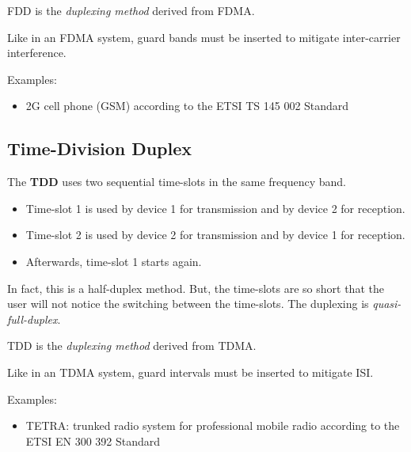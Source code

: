 \begin{refsection}
\ac{FDD} is the \emph{duplexing method} derived from \ac{FDMA}.

\begin{remark}
	Like in an \ac{FDMA} system, guard bands must be inserted to mitigate inter-carrier interference.
\end{remark}

Examples:
\begin{itemize}
	\item 2G cell phone (\acs{GSM}) according to the \acs{ETSI} TS 145 002 Standard \cite{etsits145002}
\end{itemize}

\subsection{Time-Division Duplex}

The  \textbf{\acf{TDD}} uses two sequential time-slots in the same frequency band.
\begin{itemize}
	\item Time-slot 1 is used by device 1 for transmission and by device 2 for reception.
	\item Time-slot 2 is used by device 2 for transmission and by device 1 for reception.
	\item Afterwards, time-slot 1 starts again.
\end{itemize}
In fact, this is a half-duplex method. But, the time-slots are so short that the user will not notice the switching between the time-slots. The duplexing is \emph{quasi-full-duplex}.

\ac{TDD} is the \emph{duplexing method} derived from \ac{TDMA}.

\begin{remark}
	Like in an \ac{TDMA} system, guard intervals must be inserted to mitigate \ac{ISI}.
\end{remark}

Examples:
\begin{itemize}
	\item \acf{TETRA}: trunked radio system for professional mobile radio according to the \acs{ETSI} EN 300 392 Standard \cite{en300392}
\end{itemize}

\begin{figure}[H]
	\centering
\end{figure}
\end{refsection}
